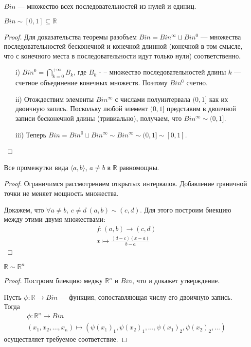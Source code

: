 \begin{definition}
    $Bin$ --- множество всех последовательностей из нулей и единиц.
\end{definition}

\begin{theorem}
    $Bin \sim [0, 1] \subseteq \mathbb{R}$
\end{theorem}
\begin{proof}
    Для доказательства теоремы разобъем $\displaystyle Bin = Bin^{\infty} \sqcup
    Bin^0$ --- множества последовательностей бесконечной и конечной длинной
    (конечной в том смысле, что с конечного места в последовательности идут
    только нули) соответственно.
    \begin{itemize}
        \item[i)] $\displaystyle Bin^0 = \bigcap_{k=0}^{+\infty}{B_k}$, где $B_k$ -
        -- множество последовательностей длины $k$ --- счетное объединение
        конечных множеств. Поэтому $Bin^0$ счетно.
        \item[ii)] Отождествим элементы $Bin^{\infty}$ с числами полуинтервала
        $(0, 1]$ как их двоичную запись. Поскольку любой элемент $(0, 1]$
        представим в двоичной записи бесконечной длины (тривиально), получаем,
        что $Bin^{\infty} \sim (0, 1]$.
        \item[iii)] Теперь $Bin = Bin^0 \sqcup Bin^{\infty} \sim Bin^{\infty}
        \sim (0, 1] \sim [0, 1]$.
    \end{itemize}
\end{proof}

\begin{theorem}
    Все промежутки вида $\langle a, b \rangle$, $a \neq b$ в $\mathbb{R}$
    равномощны.
\end{theorem}
\begin{proof}
    Ограничимся рассмотрением открытых интервалов. Добавление граничной точки
    не меняет мощность множества.

    Докажем, что $\forall a \neq b,~ c \neq d~(a, b) \sim (c, d)$.
    Для этого построим биекцию между этими двумя множествами:
    \begin{gather*}
        f \colon (a, b) \to (c, d) \\
        x \longmapsto \frac{(d - c)(x - a)}{b - a}
    \end{gather*}
\end{proof}

\begin{theorem}
    $\mathbb{R} \sim \mathbb{R}^n$
\end{theorem}
\begin{proof}
    Построим биекцию меджу $\mathbb{R}^n$ и $Bin$, что и докажет утверждение.

    Пусть $\psi \colon \mathbb{R} \to Bin$ --- функция, сопоставляющая
    числу его двоичную запись. Тогда
    \begin{gather*}
        \phi \colon \mathbb{R}^n \to Bin \\
        (x_1, x_2, \ldots, x_n) \longmapsto (\psi(x_1)_1, \psi(x_2)_1, \ldots,
        \psi(x_1)_2, \psi(x_2)_2, \ldots)
    \end{gather*}
    осуществляет требуемое соответствие.
\end{proof}

